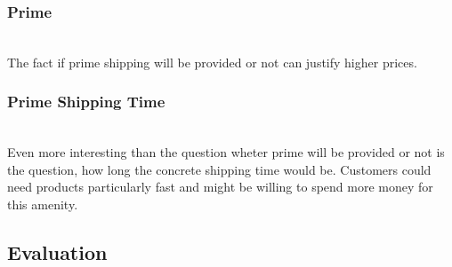 	\subsubsection{Prime}
		~\\
		The fact if prime shipping will be provided or not can justify higher prices.
	\subsubsection{Prime Shipping Time}
		~\\
		Even more interesting than the question wheter prime will be provided or not is the question, how long the concrete shipping time would be. Customers could need products particularly fast and might be willing to spend more money for this amenity.
\subsection{Evaluation}
